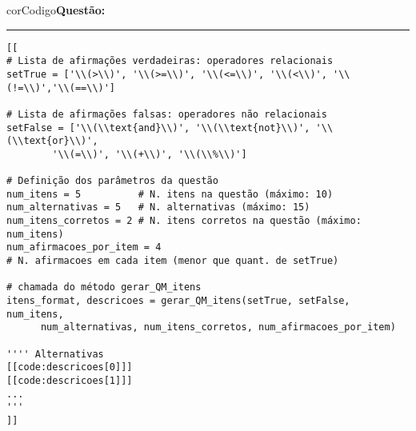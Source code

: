 \begin{listing}[!ht]
    \begin{myboxCode}{corCodigo}{\textbf{Questão: }}\vspace{3mm}
    \hrule
    \begin{verbatim}
[[
# Lista de afirmações verdadeiras: operadores relacionais
setTrue = ['\\(>\\)', '\\(>=\\)', '\\(<=\\)', '\\(<\\)', '\\(!=\\)','\\(==\\)']

# Lista de afirmações falsas: operadores não relacionais
setFalse = ['\\(\\text{and}\\)', '\\(\\text{not}\\)', '\\(\\text{or}\\)', 
        '\\(=\\)', '\\(+\\)', '\\(\\%\\)']

# Definição dos parâmetros da questão
num_itens = 5          # N. itens na questão (máximo: 10)
num_alternativas = 5   # N. alternativas (máximo: 15)
num_itens_corretos = 2 # N. itens corretos na questão (máximo: num_itens)
num_afirmacoes_por_item = 4  
# N. afirmacoes em cada item (menor que quant. de setTrue)

# chamada do método gerar_QM_itens
itens_format, descricoes = gerar_QM_itens(setTrue, setFalse, num_itens, 
      num_alternativas, num_itens_corretos, num_afirmacoes_por_item)

'''' Alternativas
[[code:descricoes[0]]]
[[code:descricoes[1]]]
...
'''
]]
\end{verbatim}
\end{myboxCode}
\caption{Exemplo de QM paramétrica de operadores relacionais -- Parte 2: Bloco de código em Python com as declarações e a chamada do método \texttt{gerar\_QM\_itens}.}
\label{lst:questaoQM_Extra1_parte2}
\end{listing}

